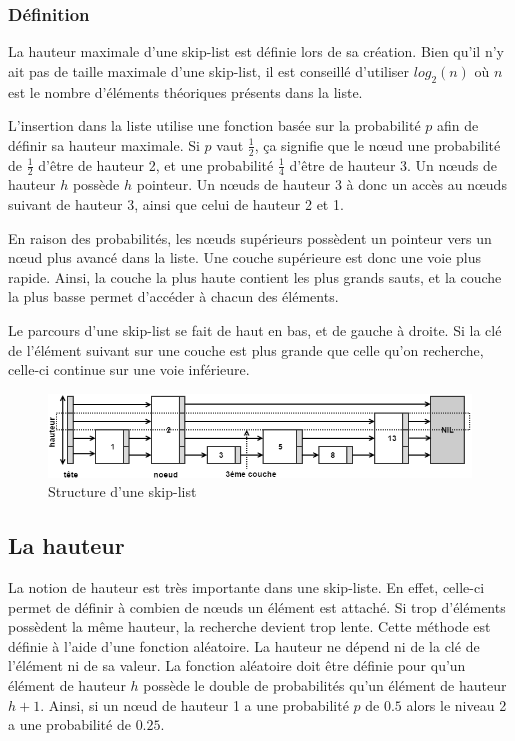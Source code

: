 \documentclass[hidelinks,a4paper, 12pt]{article}
\begin{document}
	\subsubsection*{Définition}
	La hauteur maximale d'une skip-list est définie lors de sa création. Bien qu'il n'y ait pas de taille maximale d'une skip-list, il est conseillé d'utiliser $log_2(n)$ où $n$ est le nombre d'éléments théoriques présents dans la liste.
	
	L'insertion dans la liste utilise une fonction basée sur la probabilité $p$ afin de définir sa hauteur maximale. Si $p$ vaut $\frac{1}{2}$, ça signifie que le nœud une probabilité de $\frac{1}{2}$ d'être de hauteur 2, et une probabilité $\frac{1}{4}$ d'être de hauteur 3. Un nœuds de hauteur $h$ possède $h$ pointeur. Un nœuds de hauteur 3 à donc un accès au nœuds suivant de hauteur 3, ainsi que celui de hauteur 2 et 1.
	
	En raison des probabilités, les nœuds supérieurs possèdent un pointeur vers un nœud plus avancé dans la liste. Une couche supérieure est donc une voie plus rapide. Ainsi, la couche la plus haute contient les plus grands sauts, et la couche la plus basse permet d'accéder à chacun des éléments.
		
	Le parcours d'une skip-list se fait de haut en bas, et de gauche à droite. Si la clé de l'élément suivant sur une couche est plus grande que celle qu'on recherche, celle-ci continue sur une voie inférieure.	
	
	\begin{figure}[h]
		\includegraphics[width=\textwidth]{img/struct}
		\caption{Structure d'une skip-list}
		\label{StructSkip}
	\end{figure}
	
	\subsection{La hauteur}
	La notion de hauteur est très importante dans une skip-liste. En effet, celle-ci permet de définir à combien de nœuds un élément est attaché. Si trop d'éléments possèdent la même hauteur, la recherche devient trop lente.	Cette méthode est définie à l'aide d'une fonction aléatoire. La hauteur ne dépend ni de la clé de l'élément ni de sa valeur. La fonction aléatoire doit être définie pour qu'un élément de hauteur $h$ possède le double de probabilités qu'un élément de hauteur $h+1$. Ainsi, si un nœud de hauteur 1 a une probabilité $p$ de $0.5$ alors le niveau 2 a une probabilité de $0.25$.
		
\end{document}
